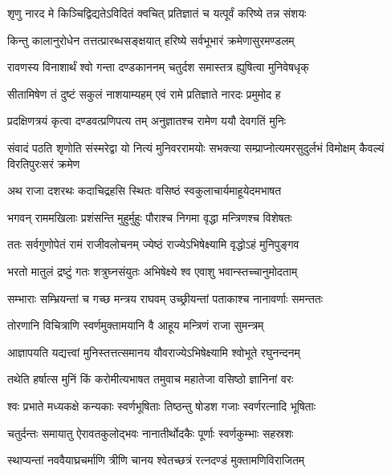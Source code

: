 \twolineshloka
{शृणु नारद मे किञ्चिद्विद्यतेऽविदितं क्वचित्}
{प्रतिज्ञातं च यत्पूर्वं करिष्ये तन्न संशयः} %

\twolineshloka
{किन्तु कालानुरोधेन तत्तत्प्रारब्धसङ्क्षयात्}
{हरिष्ये सर्वभूभारं क्रमेणासुरमण्डलम्} %

\twolineshloka
{रावणस्य विनाशार्थं श्वो गन्ता दण्डकाननम्}
{चतुर्दश समास्तत्र ह्युषित्वा मुनिवेषधृक्} %

\twolineshloka
{सीतामिषेण तं दुष्टं सकुलं नाशयाम्यहम्}
{एवं रामे प्रतिज्ञाते नारदः प्रमुमोद ह} %

\twolineshloka
{प्रदक्षिणत्रयं कृत्वा दण्डवत्प्रणिपत्य तम्}
{अनुज्ञातश्च रामेण ययौ देवगतिं मुनिः} %

\fourlineindentedshloka
{संवादं पठति शृणोति संस्मरेद्वा}
{यो नित्यं मुनिवररामयोः सभक्त्या}
{सम्प्राप्नोत्यमरसुदुर्लभं विमोक्षम्}
{कैवल्यं विरतिपुरःसरं क्रमेण} %





\twolineshloka
{अथ राजा दशरथः कदाचिद्रहसि स्थितः}
{वसिष्ठं स्वकुलाचार्यमाहूयेदमभाषत} %

\twolineshloka
{भगवन् राममखिलाः प्रशंसन्ति मुहुर्मुहुः}
{पौराश्च निगमा वृद्धा मन्त्रिणश्च विशेषतः} %

\twolineshloka
{ततः सर्वगुणोपेतं रामं राजीवलोचनम्}
{ज्येष्ठं राज्येऽभिषेक्ष्यामि वृद्धोऽहं मुनिपुङ्गव} %

\twolineshloka
{भरतो मातुलं द्रष्टुं गतः शत्रुघ्नसंयुतः}
{अभिषेक्ष्ये श्व एवाशु भवान्स्तच्चानुमोदताम्} %

\twolineshloka
{सम्भाराः सम्भ्रियन्तां च गच्छ मन्त्रय राघवम्}
{उच्छ्रीयन्तां पताकाश्च नानावर्णाः समन्ततः} %

\twolineshloka
{तोरणानि विचित्राणि स्वर्णमुक्तामयानि वै}
{आहूय मन्त्रिणं राजा सुमन्त्रम्} %

\twolineshloka
{आज्ञापयति यद्यत्त्वां मुनिस्तत्तत्समानय}
{यौवराज्येऽभिषेक्ष्यामि श्वोभूते रघुनन्दनम्} %

\twolineshloka
{तथेति हर्षात्स मुनिं किं करोमीत्यभाषत}
{तमुवाच महातेजा वसिष्ठो ज्ञानिनां वरः} %

\twolineshloka
{श्वः प्रभाते मध्यकक्षे कन्यकाः स्वर्णभूषिताः}
{तिष्ठन्तु षोडश गजाः स्वर्णरत्नादि भूषिताः} %

\twolineshloka
{चतुर्दन्तः समायातु ऐरावतकुलोद्भवः}
{नानातीर्थोदकैः पूर्णाः स्वर्णकुम्भाः सहस्रशः} %

\twolineshloka
{स्थाप्यन्तां नववैयाघ्रचर्माणि त्रीणि चानय}
{श्वेतच्छत्रं रत्नदण्डं मुक्तामणिविराजितम्} %

